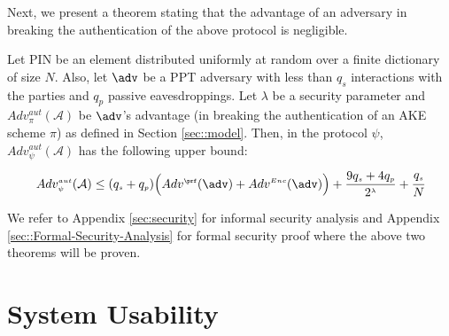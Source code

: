 \documentclass[runningheads]{llncs}
\newcommand{\sss}{\scriptscriptstyle}
\newcommand{\A}{\mathcal{A}}
\begin{document}
Next, we present a theorem stating that the advantage of an adversary in breaking the authentication of the above protocol is negligible.  

\begin{theorem} [Authentication]
Let PIN be an element distributed uniformly at random over a finite dictionary of size $N$. Also, 
let $\adv$ be a PPT adversary with less than $q_s$ interactions with the parties and $q_p$ passive eavesdroppings. Let $\lambda$ be a security parameter and $Adv_{\sss\pi}^{\sss aut}(\A)$ be  $\adv$'s advantage (in breaking the authentication of an AKE scheme $\pi$) as defined in Section \ref{sec::model}. Then, in the protocol $\psi$, $Adv_{\sss \psi}^{\sss aut}(\A)$ has the following upper bound:  
%
\vspace{-3mm}
  \begin{equation*}
 Adv_{\sss \psi}^{\sss aut}(\A)  \leq (q_{\sss s} + q_{\sss p})\Big(Adv^{\sss\prf}(\adv)+Adv^{\sss Enc}(\adv)\Big)+\frac{9q_{\sss s}+4q_{\sss p}}{2^{\sss\lambda}}+  \cfrac{q_{\sss s}}{N}
 \end{equation*}
%
\end{theorem}

\vspace{-2mm}


We refer to Appendix \ref{sec:security} for informal security analysis and Appendix \ref{sec::Formal-Security-Analysis} for formal security proof where the above two theorems will be proven.  


\section{System Usability}
\label{sec:asymmetric}
\end{document}
